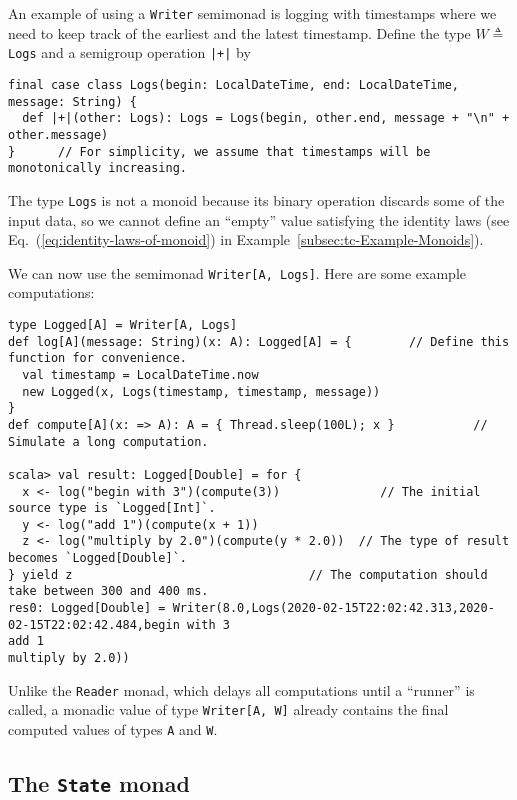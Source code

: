 An example of using a \lstinline!Writer! semimonad
is logging with timestamps where we need to keep track of the earliest
and the latest timestamp. Define the type $W\triangleq~$\lstinline!Logs!
and a semigroup operation \lstinline!|+|! by
\begin{lstlisting}
final case class Logs(begin: LocalDateTime, end: LocalDateTime, message: String) {
  def |+|(other: Logs): Logs = Logs(begin, other.end, message + "\n" + other.message)
}      // For simplicity, we assume that timestamps will be monotonically increasing.
\end{lstlisting}
The type \lstinline!Logs! is not a monoid because its binary operation
discards some of the input data, so we cannot define an \textsf{``}empty\textsf{''}
value satisfying the identity laws (see Eq.~(\ref{eq:identity-laws-of-monoid})
in Example~\ref{subsec:tc-Example-Monoids}).

We can now use the semimonad \lstinline!Writer[A, Logs]!. Here are
some example computations:
\begin{lstlisting}
type Logged[A] = Writer[A, Logs]
def log[A](message: String)(x: A): Logged[A] = {        // Define this function for convenience.
  val timestamp = LocalDateTime.now
  new Logged(x, Logs(timestamp, timestamp, message))
}
def compute[A](x: => A): A = { Thread.sleep(100L); x }           // Simulate a long computation.

scala> val result: Logged[Double] = for {
  x <- log("begin with 3")(compute(3))              // The initial source type is `Logged[Int]`.
  y <- log("add 1")(compute(x + 1))
  z <- log("multiply by 2.0")(compute(y * 2.0))  // The type of result becomes `Logged[Double]`.
} yield z                                 // The computation should take between 300 and 400 ms.
res0: Logged[Double] = Writer(8.0,Logs(2020-02-15T22:02:42.313,2020-02-15T22:02:42.484,begin with 3
add 1
multiply by 2.0))
\end{lstlisting}

Unlike the \lstinline!Reader! monad, which delays all computations
until a \textsf{``}runner\textsf{''} is called, a monadic value of type \lstinline!Writer[A, W]!
already contains the final computed values of types \lstinline!A!
and \lstinline!W!.

\subsection{The \texttt{State} monad\label{subsec:The-State-monad}}

